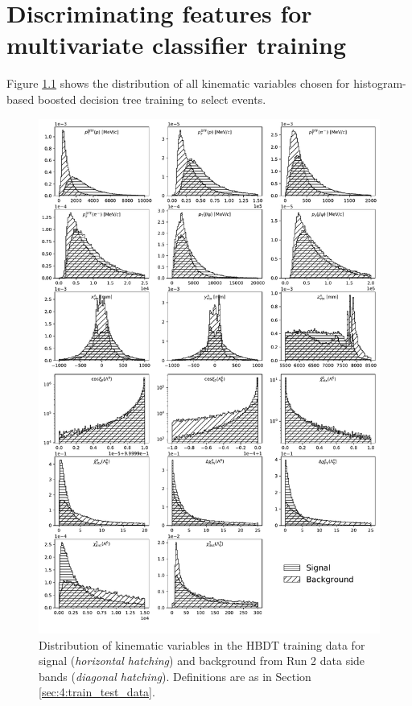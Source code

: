 \chapter{Discriminating features for multivariate classifier training}
\label{app:bdt_features}
Figure \ref{fig:B:feature_distributions} shows the distribution of all kinematic variables chosen for histogram-based boosted decision tree training to select \demonstratorfull events.

\begin{figure}
	\centering
	\includegraphics[width=.9\textwidth]{graphics/appendices/feature_distributions_balance.pdf}
	\caption{Distribution of kinematic variables in the HBDT training data for signal (\textit{horizontal hatching}) and background from Run 2 data side bands (\textit{diagonal hatching}).
	Definitions are as in Section \ref{sec:4:train_test_data}.}
	\label{fig:B:feature_distributions}
\end{figure}